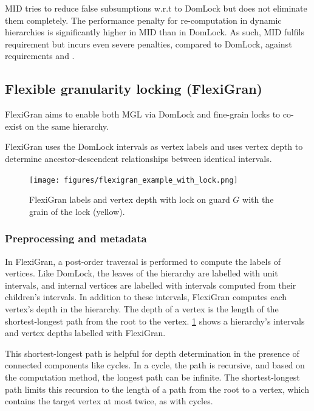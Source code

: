 MID tries to reduce false subsumptions w.r.t to DomLock but does not eliminate them completely. The performance penalty for re-computation in dynamic hierarchies is significantly higher in MID than in DomLock. As such, MID fulfils requirement \Rb but incurs even severe penalties, compared to DomLock, against requirements \Rc and \Rd.

\subsection{Flexible granularity locking (FlexiGran)}

FlexiGran \cite{FlexiGran2024} aims to enable both MGL via DomLock and fine-grain locks to co-exist on the same hierarchy. 

FlexiGran uses the DomLock intervals as vertex labels and uses vertex depth to determine ancestor-descendent relationships between identical intervals.

\begin{figure}
    \centering
    \captionsetup{justification=centering}
    \texttt{[image: figures/flexigran\_example\_with\_lock.png]}
    \caption{FlexiGran labels and vertex depth with lock on guard $G$ with the grain of the lock (yellow).}
    \label{fig:flexigran_example_locked}
\end{figure}

\subsubsection{Preprocessing and metadata}

In FlexiGran, a post-order traversal is performed to compute the labels of vertices. Like DomLock, the leaves of the hierarchy are labelled with unit intervals, and internal vertices are labelled with intervals computed from their children's intervals. In addition to these intervals, FlexiGran computes each vertex's depth in the hierarchy. The depth of a vertex is the length of the shortest-longest path from the root to the vertex. \cref{fig:flexigran_example_locked} shows a hierarchy's intervals and vertex depths labelled with FlexiGran.

This shortest-longest path is helpful for depth determination in the presence of connected components like cycles. In a cycle, the path is recursive, and based on the computation method, the longest path can be infinite. The shortest-longest path limits this recursion to the length of a path from the root to a vertex, which contains the target vertex at most twice, as with cycles. 

